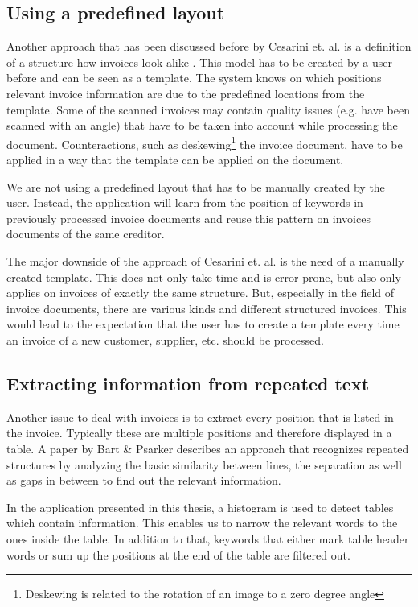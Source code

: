 \subsection{Using a predefined layout}
Another approach that has been discussed before by Cesarini et. al. is a definition of a structure how invoices look alike \cite{Cesarini98}. This model has to be created by a user before and can be seen as a template. The system knows on which positions relevant invoice information are due to the predefined locations from the template.
Some of the scanned invoices may contain quality issues (e.g. have been scanned with an angle) that have to be taken into account while processing the document. Counteractions, such as deskewing\footnote{Deskewing is related to the rotation of an image to a zero degree angle} the invoice document, have to be applied in a way that the template can be applied on the document.

We are not using a predefined layout that has to be manually created by the user. Instead, the application will learn from the position of keywords in previously processed invoice documents and reuse this pattern on invoices documents of the same creditor.

The major downside of the approach of Cesarini et. al. \cite{Cesarini98} is the need of a manually created template. This does not only take time and is error-prone, but also only applies on invoices of exactly the same structure. But, especially in the field of invoice documents, there are various kinds and different structured invoices. This would lead to the expectation that the user has to create a template every time an invoice of a new customer, supplier, etc. should be processed.

\subsection{Extracting information from repeated text}
Another issue to deal with invoices is to extract every position that is listed in the invoice. Typically these are multiple positions and therefore displayed in a table. A paper by Bart \& Psarker \cite{Bart10}  describes an approach that recognizes repeated structures by analyzing the basic similarity between lines, the separation as well as gaps in between to find out the relevant information.

In the application presented in this thesis, a histogram is used to detect tables which contain information. This enables us to narrow the relevant words to the ones inside the table. In addition to that, keywords that either mark table header words or sum up the positions at the end of the table are filtered out.

